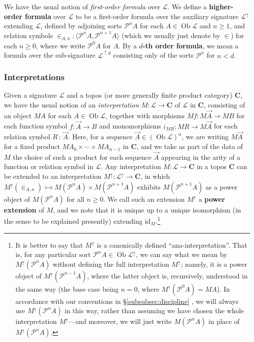 \documentclass{amsart}
\newcommand\bC{\mathbf{C}}
\newcommand\br[1]{\langle{}#1\rangle{}}
\newcommand\cL{\mathcal{L}}
\newcommand\cP{\mathcal{P}}
\newcommand\defword[1]{{\boldmath \textbf{#1}}}
\newcommand\id{\mathrm{id}}
\newcommand\Ob{\operatorname{Ob}}
\newcommand\pow{\mathcal{P}}
\newcommand\tolon{{\,:\,}}
\newcommand\tto{\rightarrowtail}
\newcommand\unin{{\in}}
\newcommand\up{\uparrow}
\newcommand\vA{\vek{A}}
\newcommand\vek[1]{{\vec{#1}}}
\newcommand\prerefpost[3]{%
  \texorpdfstring%
    {\hyperref[#2]{#1\ref*{#2}#3}}%
    {#1\ref*{#2}#3}%
}
\newcommand\sref[1]{\prerefpost{\S}{#1}{}}
\theoremstyle{definition}
\theoremstyle{remark}
\theoremstyle{plainwithref}
\begin{document}
We have the usual notion of \emph{first-order formula} over \( \cL \).
We define a \defword{higher-order formula} over \( \cL \) to be a first-order formula over the auxiliary signature \( \cL^\up \) extending \( \cL \), defined by adjoining sorts \( \cP^n A \) for each \( A \in \Ob \cL \) and \( n \ge 1 \), and relation symbols \( \in_{A,n} \colon \br{\cP^n A,\cP^{n+1} A} \) (which we usually just denote by \( \in \)) for each \( n \ge 0 \), where we write \( \cP^0 A \) for \( A \).
By a \defword{\( d \)-th order formula}, we mean a formula over the sub-signature \( \cL^{\up d} \) consisting only of the sorts \( \cP^n \) for \( n < d \).

\subsubsection{Interpretations} \label{subsubsec:interpretations}
Given a signature \( \cL \) and a topos (or more generally finite product category) \( \bC \), we have the usual notion of an \emph{interpretation} \( M \colon \cL \to \bC \) of \( \cL \) in \( \bC \), consisting of an object \( M A \) for each \( A \in \Ob \cL \), together with morphisms \( M f \colon M \vA \to M B \) for each function symbol \( f \colon \vA \to B \) and monomorphisms \( i_{M R} \colon M R \to M \vA \) for each relation symbol \( R \tolon \vA \).
Here, for a sequence \( \vA \in (\Ob \cL)^n \), we are writing \( M \vA \) for a fixed product \( M A_0 \times \cdots \times M A_{n-1} \) in \( \bC \), and we take as part of the data of \( M \) the choice of such a product for each sequence \( \vA \) appearing in the arity of a function or relation symbol in \( \cL \).
Any interpretation \( M \colon \cL \to \bC \) in a topos \( \bC \) can be extended to an interpretation \( M^\up \colon \cL^\up \to \bC \), in which \( M^\up (\unin_{A,n}) \tto M(\pow^n A) \times M(\pow^{n+1} A) \) exhibits \( M(\pow^{n+1} A) \) as a power object of \( M (\pow^n A) \) for all \( n \ge 0 \).
We call such an extension \( M^\up \) a \defword{power extension} of \( M \), and we note that it is unique up to a unique isomorphism (in the sense to be explained presently) extending \( \id_M \).\footnote{ %
  It is better to say that \( M^\up \) is a canonically defined ``ana-interpretation''.
  That is, for any particular sort \( \pow^n A \in \Ob \cL^\up \), we can say what we mean by \( M^\up(\pow^n A) \) without defining the full interpretation \( M^\up \); namely, it is a power object of \( M^\up(\pow^{n-1} A) \), where the latter object is, recursively, understood in the same way (the base case being \( n = 0 \), where \( M^\up(\pow^0 A) = M A \)).
  In accordance with our conventions in \sref{subsubsec:discipline}, we will always use \( M^\up(\pow^n A) \) in this way, rather than assuming we have chosen the whole interpretation \( M^\up \)---and moreover, we will just write \( M(\pow^n A) \) in place of \( M^\up (\pow^n A) \).
}
\end{document}

